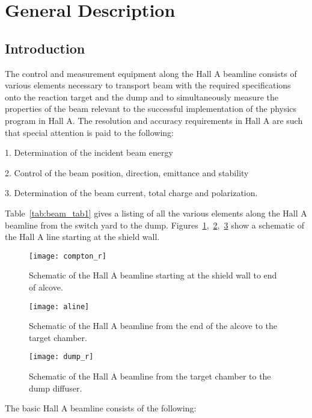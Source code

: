 \section{General Description}
\subsection{Introduction}

The control and measurement equipment along the Hall A beamline consists of 
various elements necessary to transport beam with the required specifications 
onto the reaction target and the dump and to simultaneously measure the 
properties of the beam relevant to the successful implementation of the 
physics program in Hall A.  The resolution and accuracy requirements in Hall 
A are such that special attention is paid to the following:

\vskip 0.5cm

1. Determination of the incident beam energy

2. Control of the beam position, direction, emittance and stability

3. Determination of the beam current, total charge and polarization.

\vskip 0.5cm
Table~\ref{tab:beam_tab1} gives a listing of all the various elements
along the Hall A beamline from the switch yard to the dump.
Figures~\ref{fig:Aline1},~\ref{fig:Aline2},~\ref{fig:Aline3} show
a schematic of the Hall A line starting at the shield wall.

\begin{figure}
\begin{center}
\texttt{[image: compton\_r]}
{\linespread{1.}
\caption[Beamline: Hall A Beamline Overview]{Schematic of the Hall A beamline
starting at the shield wall to end of alcove.}
\label{fig:Aline1}}
\end{center}
\end{figure}

\begin{figure}
\begin{center}
\texttt{[image: aline]}
{\linespread{1.}
\caption[Beamline: Hall A Beamline Overview]{Schematic of the Hall A beamline
from the end of the alcove to the target chamber.}
\label{fig:Aline2}}
\end{center}
\end{figure}

\begin{figure}
\begin{center}
\texttt{[image: dump\_r]}
{\linespread{1.}
\caption[Beamline: Hall A Beamline Overview]{Schematic of the Hall A beamline
from the target chamber to the dump diffuser.}
\label{fig:Aline3}}
\end{center}
\end{figure}
The basic Hall A beamline consists of the following:


